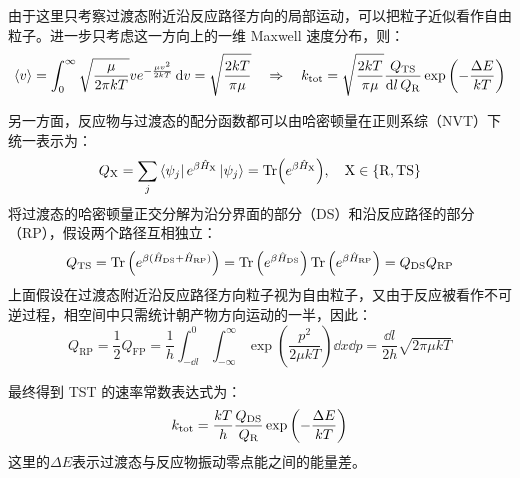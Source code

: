 由于这里只考察过渡态附近沿反应路径方向的局部运动，可以把粒子近似看作自由粒子。进一步只考虑这一方向上的一维 Maxwell 速度分布，则：
\[\langle v \rangle = \int_{0}^{\infty}\sqrt{\frac{\mu}{2 \pi kT}}ve^{ - \frac{\mu v^2}{2kT}}\dd{v}=\sqrt{\frac{2kT}{\pi \mu}} \quad \Rightarrow \quad k_{\rm tot}=\sqrt{\frac{2kT}{\pi \mu}}\frac{Q_{\mathrm{TS}}}{\dd{l}Q_{\mathrm{R}}}\exp\left(-\frac{\Delta E}{kT}\right)\]

另一方面，反应物与过渡态的配分函数都可以由哈密顿量在正则系综（NVT）下统一表示为：
\[Q_{\mathrm{X}} = \sum_j\bra{\psi_j}e^{\beta \hat{H}_{\mathrm{X}}}\ket{\psi_j}=\Tr(e^{\beta \hat{H}_{\mathrm{X}}}), \quad \mathrm{X}\in\{\mathrm{R},\mathrm{TS}\}\]
将过渡态的哈密顿量正交分解为沿分界面的部分（DS）和沿反应路径的部分（RP），假设两个路径互相独立：
\[Q_{\mathrm{TS}}=\Tr\left(e^{\beta (\hat{H}_{\mathrm{DS}}+\hat{H}_{\mathrm{RP}})}\right)=\Tr\left(e^{\beta \hat{H}_{\mathrm{DS}}}\right)\Tr\left(e^{\beta \hat{H}_{\mathrm{RP}}}\right)=Q_{\mathrm{DS}}Q_{\mathrm{RP}}\]
上面假设在过渡态附近沿反应路径方向粒子视为自由粒子，又由于反应被看作不可逆过程，相空间中只需统计朝产物方向运动的一半，因此：
\[Q_{\mathrm{RP}}=\frac{1}{2}Q_{\mathrm{FP}}=\frac{1}{h}\int_{-\dd l}^{0}\int_{-\infty}^{\infty}\exp\left(\frac{p^2}{2 \mu kT}\right)\dd x\dd p=\frac{\dd l}{2h}\sqrt{2 \pi \mu kT}\]

最终得到 TST 的速率常数表达式为：
\[k_{\rm tot}=\frac{kT}{h} \frac{Q_{\mathrm{DS}}}{Q_{\mathrm{R}}} \exp\left(-\frac{\Delta E}{kT}\right)\]
这里的$\Delta E$表示过渡态与反应物振动零点能之间的能量差。

\newpage
